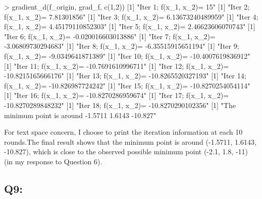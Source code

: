 \documentclass[
]{article}
\newenvironment{Shaded}{\begin{snugshade}}{\end{snugshade}}
\newcommand{\DecValTok}[1]{\textcolor[rgb]{0.00,0.00,0.81}{#1}}
\newcommand{\FunctionTok}[1]{\textcolor[rgb]{0.00,0.00,0.00}{#1}}
\newcommand{\NormalTok}[1]{#1}
\newcommand{\SpecialCharTok}[1]{\textcolor[rgb]{0.00,0.00,0.00}{#1}}
\newcommand{\StringTok}[1]{\textcolor[rgb]{0.31,0.60,0.02}{#1}}
\begin{document}
\begin{Shaded}
\begin{Highlighting}[]
\SpecialCharTok{\textgreater{}} \FunctionTok{gradient\_d}\NormalTok{(f\_origin, grad\_f, }\FunctionTok{c}\NormalTok{(}\DecValTok{1}\NormalTok{,}\DecValTok{2}\NormalTok{))}
\NormalTok{[}\DecValTok{1}\NormalTok{] }\StringTok{"Iter 1; f(x\_1, x\_2)= 15"}
\NormalTok{[}\DecValTok{1}\NormalTok{] }\StringTok{"Iter 2; f(x\_1, x\_2)= 7.81301856"}
\NormalTok{[}\DecValTok{1}\NormalTok{] }\StringTok{"Iter 3; f(x\_1, x\_2)= 6.13673240489959"}
\NormalTok{[}\DecValTok{1}\NormalTok{] }\StringTok{"Iter 4; f(x\_1, x\_2)= 4.45179110852303"}
\NormalTok{[}\DecValTok{1}\NormalTok{] }\StringTok{"Iter 5; f(x\_1, x\_2)= 2.46623606070743"}
\NormalTok{[}\DecValTok{1}\NormalTok{] }\StringTok{"Iter 6; f(x\_1, x\_2)= {-}0.020016603013886"}
\NormalTok{[}\DecValTok{1}\NormalTok{] }\StringTok{"Iter 7; f(x\_1, x\_2)= {-}3.06809730294683"}
\NormalTok{[}\DecValTok{1}\NormalTok{] }\StringTok{"Iter 8; f(x\_1, x\_2)= {-}6.35515915651194"}
\NormalTok{[}\DecValTok{1}\NormalTok{] }\StringTok{"Iter 9; f(x\_1, x\_2)= {-}9.0349641871389"}
\NormalTok{[}\DecValTok{1}\NormalTok{] }\StringTok{"Iter 10; f(x\_1, x\_2)= {-}10.4007619836912"}
\NormalTok{[}\DecValTok{1}\NormalTok{] }\StringTok{"Iter 11; f(x\_1, x\_2)= {-}10.7691610996711"}
\NormalTok{[}\DecValTok{1}\NormalTok{] }\StringTok{"Iter 12; f(x\_1, x\_2)= {-}10.8215165666176"}
\NormalTok{[}\DecValTok{1}\NormalTok{] }\StringTok{"Iter 13; f(x\_1, x\_2)= {-}10.8265520327193"}
\NormalTok{[}\DecValTok{1}\NormalTok{] }\StringTok{"Iter 14; f(x\_1, x\_2)= {-}10.826987724242"}
\NormalTok{[}\DecValTok{1}\NormalTok{] }\StringTok{"Iter 15; f(x\_1, x\_2)= {-}10.8270254054114"}
\NormalTok{[}\DecValTok{1}\NormalTok{] }\StringTok{"Iter 16; f(x\_1, x\_2)= {-}10.8270286959674"}
\NormalTok{[}\DecValTok{1}\NormalTok{] }\StringTok{"Iter 17; f(x\_1, x\_2)= {-}10.8270289848232"}
\NormalTok{[}\DecValTok{1}\NormalTok{] }\StringTok{"Iter 18; f(x\_1, x\_2)= {-}10.8270290102356"}
\NormalTok{[}\DecValTok{1}\NormalTok{] }\StringTok{"The minimum point is around {-}1.5711 1.6143 {-}10.827"}
\end{Highlighting}
\end{Shaded}

For text space concern, I choose to print the iteration information at
each 10 rounds.The final result shows that the minimum point is around
(-1.5711, 1.6143, -10.827), which is close to the observed possible
minimum point (-2.1, 1.8, -11) (in my response to Question 6).

\hypertarget{q9}{%
\subsection{Q9:}\label{q9}}
\end{document}
